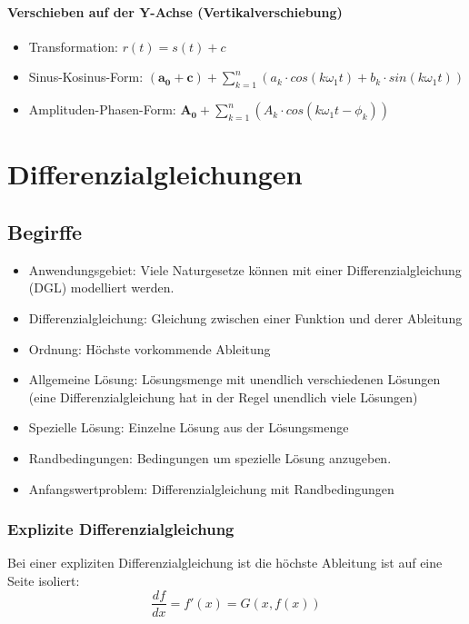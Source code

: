 \paragraph{Verschieben auf der Y-Achse (Vertikalverschiebung)}
\begin{itemize}
  \item Transformation: $r(t) = s(t) + c$
  \item Sinus-Kosinus-Form: $\boldsymbol{(a_0 + c)} + \sum_{k=1}^{n} ( a_k \cdot
    cos(k \omega_1 t) + b_k \cdot sin(k \omega_1 t))$
  \item Amplituden-Phasen-Form: $\boldsymbol{A_0} + \sum_{k=1}^{n}
    (A_k \cdot cos(k \omega_1 t  - \phi_k))$
\end{itemize}


\section{Differenzialgleichungen}
\subsection{Begirffe}
\begin{itemize}
  \item Anwendungsgebiet: Viele Naturgesetze können mit einer
    Differenzialgleichung (DGL) modelliert werden.
  \item Differenzialgleichung: Gleichung zwischen einer Funktion und
    derer Ableitung
  \item Ordnung: Höchste vorkommende Ableitung
  \item Allgemeine Lösung: Lösungsmenge mit unendlich verschiedenen
    Lösungen (eine Differenzialgleichung hat in der Regel unendlich viele Lösungen)
  \item Spezielle Lösung: Einzelne Lösung aus der Lösungsmenge
  \item Randbedingungen: Bedingungen um spezielle Lösung anzugeben.
  \item Anfangswertproblem: Differenzialgleichung mit Randbedingungen
\end{itemize}

\subsubsection{Explizite Differenzialgleichung}
Bei einer expliziten Differenzialgleichung ist die höchste Ableitung ist
auf eine Seite isoliert:
\[ \frac{df}{dx} = f'(x) = G(x, f(x)) \]


